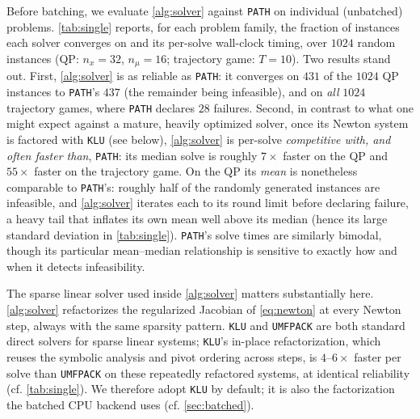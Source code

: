 \documentclass[conference]{IEEEtran}
\begin{document}
Before batching, we evaluate \cref{alg:solver} against \texttt{PATH} on individual
(unbatched) problems. \cref{tab:single} reports, for each problem family, the fraction of
instances each solver converges on and its per-solve wall-clock timing, over $1024$ random
instances (QP: $n_x = 32$, $n_\mu = 16$; trajectory game: $T = 10$).
Two results stand out. First, \cref{alg:solver} is as reliable as \texttt{PATH}:
it converges on $431$ of the $1024$ QP instances to \texttt{PATH}'s $437$ (the remainder
being infeasible), and on \emph{all} $1024$ trajectory games, where \texttt{PATH} declares $28$ failures.
Second, in contrast to what one might expect against a mature, heavily optimized
solver, once its Newton system is factored with \texttt{KLU} (see below), \cref{alg:solver}
is per-solve \emph{competitive with, and often faster than}, \texttt{PATH}: its median solve
is roughly $7\times$ faster on the QP and $55\times$ faster on the trajectory game. On the
QP its \emph{mean} is nonetheless comparable to \texttt{PATH}'s: roughly half of the randomly
generated instances are infeasible, and \cref{alg:solver} iterates each to its round limit
before declaring failure, a heavy tail that inflates its own mean well above its median
(hence its large standard deviation in \cref{tab:single}). \texttt{PATH}'s solve times are
similarly bimodal, though its particular mean--median relationship is sensitive to exactly
how and when it detects infeasibility.

The sparse linear solver used inside \cref{alg:solver} matters substantially here.
\cref{alg:solver} refactorizes the regularized Jacobian of \cref{eq:newton} at every Newton
step, always with the same sparsity pattern. \texttt{KLU}
\cite{davis2010algorithm} and \texttt{UMFPACK} \cite{davis2004algorithm} are both
standard direct solvers for sparse linear systems; \texttt{KLU}'s in-place refactorization,
which reuses the symbolic analysis and pivot ordering across steps, is $4$--$6\times$ faster
per solve than \texttt{UMFPACK} on these repeatedly refactored systems, at identical
reliability (cf. \cref{tab:single}). We therefore adopt \texttt{KLU} by default; it is also the
factorization the batched CPU backend uses (cf. \cref{sec:batched}).
\end{document}
